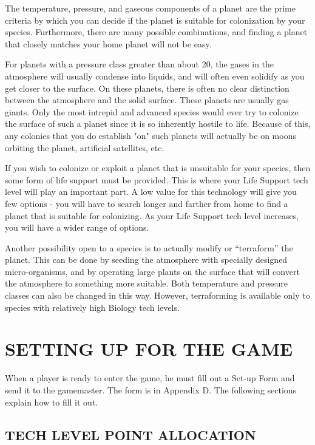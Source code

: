 \documentclass[10pt,titlepage]{article}
\begin{document}
The temperature, pressure, and gaseous components of a planet are the prime
criteria by which you can decide if the planet is suitable for colonization by
your species.  Furthermore, there are many possible combinations, and finding
a planet that closely matches your home planet will not be easy.

For planets with a pressure class greater than about 20, the gases in the
atmosphere will usually condense into liquids, and will often even solidify as
you get closer to the surface.  On these planets, there is often no clear
distinction between the atmosphere and the solid surface.  These planets are
usually gas giants.  Only the most intrepid and advanced species would ever try
to colonize the surface of such a planet since it is so inherently hostile to
life.  Because of this, any colonies that you do establish "on" such planets
will actually be on moons orbiting the planet, artificial satellites, etc.

If you wish to colonize or exploit a planet that is unsuitable for your
species, then some form of life support must be provided.  This is where your
Life Support tech level will play an important part.  A low value for this
technology will give you few options - you will have to search longer and
farther from home to find a planet that is suitable for colonizing.  As your
Life Support tech level increases, you will have a wider range of options.

Another possibility open to a species is to actually modify or ``terraform'' the
planet.  This can be done by seeding the atmosphere with specially designed
micro-organisms, and by operating large plants on the surface that will convert
the atmosphere to something more suitable.  Both temperature and pressure
classes can also be changed in this way.  However, terraforming is available
only to species with relatively high Biology tech levels.



\section{SETTING UP FOR THE GAME}

When a player is ready to enter the game, he must fill out a Set-up Form and
send it to the gamemaster.  The form is in Appendix D.  The following sections
explain how to fill it out.


\subsection{TECH LEVEL POINT ALLOCATION}
\end{document}
